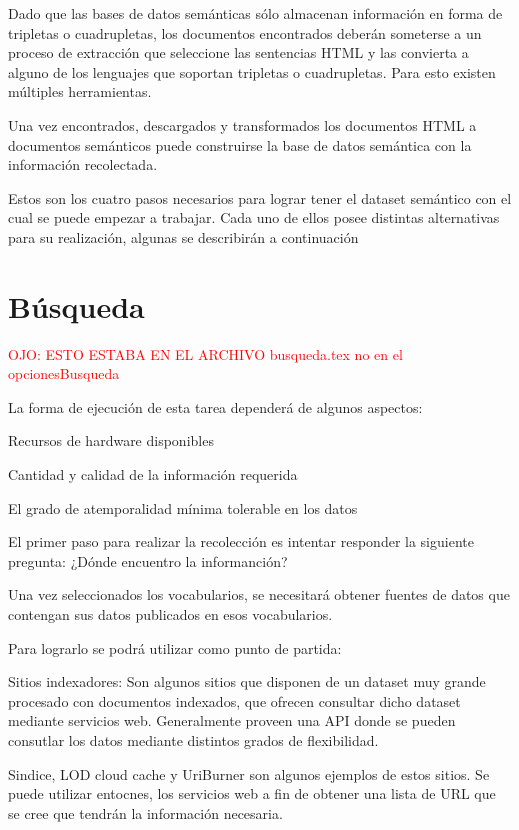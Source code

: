 Dado que las bases de datos semánticas sólo almacenan información en forma de tripletas o cuadrupletas, los documentos encontrados 
deberán someterse a un proceso de extracción que seleccione las sentencias HTML y las convierta a alguno de los lenguajes que soportan  
tripletas o cuadrupletas. Para esto existen múltiples herramientas. 

Una vez encontrados, descargados y transformados los documentos HTML a documentos semánticos puede construirse la base de datos semántica 
con la información recolectada. 

Estos son los cuatro pasos necesarios para lograr tener el dataset semántico con el cual se puede empezar a trabajar. Cada uno de ellos 
posee distintas alternativas para su realización, algunas se describirán a continuación 



\section{Búsqueda}
%
\textcolor{red}{OJO: ESTO ESTABA EN EL ARCHIVO busqueda.tex no en el opcionesBusqueda}


La forma de ejecución de esta tarea dependerá de algunos aspectos:

Recursos de hardware disponibles

Cantidad y calidad de la información requerida

El grado de atemporalidad mínima tolerable en los datos

El primer paso para realizar la recolección es intentar responder la siguiente pregunta: ¿Dónde encuentro la informanción?

Una vez seleccionados los vocabularios, se necesitará obtener fuentes de datos que contengan sus datos publicados en esos vocabularios.
 
Para lograrlo se podrá utilizar como punto de partida:

Sitios indexadores: Son algunos sitios que disponen de un dataset muy grande procesado con documentos indexados, que ofrecen consultar dicho 
dataset mediante servicios web. Generalmente proveen una API donde se pueden consutlar los datos mediante distintos grados de flexibilidad.

Sindice, LOD cloud cache y UriBurner son algunos ejemplos de estos sitios. Se puede utilizar entocnes, los servicios web a fin
de obtener una lista de URL que se cree que tendrán la información necesaria.

